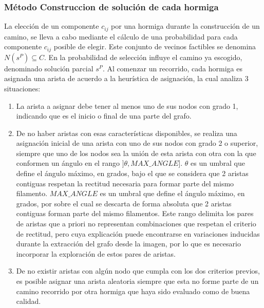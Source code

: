 \subsubsection{M\'etodo Construccion de soluci\'on de cada hormiga}
La elecci\'on de un componente $c_{ij}$ por una hormiga durante la construcci\'on de un camino,
se lleva a cabo mediante el c\'alculo de una probabilidad para cada componente $c_{ij}$ posible de elegir. Este conjunto de vecinos factibles se denomina $N(s^{P}) \subseteq C$. En la probabilidad de selecci\'on influye el camino ya escogido, denominado soluci\'on parcial $s^{P}$. Al comenzar un recorrido, cada hormiga es asignada una arista de acuerdo a la heur\'istica de asignaci\'on, la cual analiza 3 situaciones:
\begin{enumerate}
\item La arista a asignar debe tener al menos uno de sus nodos con grado 1, indicando que es el inicio o final de una parte del grafo.

\item De no haber aristas con esas caracter\'isticas disponibles, se realiza una asignaci\'on inicial de una arista con uno de sus nodos con grado 2 o superior, siempre que uno de los nodos sea la uni\'on de esta arista con otra con la que conformen un \'angulo en el rango $]\theta, MAX\_ANGLE]$. $\theta$ es un umbral que define el \'angulo m\'aximo, en grados, bajo el que se considera que 2 aristas contiguas respetan la rectitud necesaria para formar parte del mismo filamento. $MAX\_ANGLE$ es un umbral que define el \'angulo m\'aximo, en grados, por sobre el cual se descarta de forma absoluta que 2 aristas contiguas forman parte del mismo filamentos. Este rango delimita los pares de aristas que a priori no representan combinaciones que respetan el criterio de rectitud, pero cuya explicaci\'on puede encontrarse en variaciones inducidas durante la extracci\'on del grafo desde la imagen, por lo que es necesario incorporar la exploraci\'on de estos pares de aristas.

\item De no existir aristas con alg\'un nodo que cumpla con los dos criterios previos, es posible asignar una arista aleatoria siempre que esta no forme parte de un camino recorrido por otra hormiga que haya sido evaluado como de buena calidad.
\end{enumerate}

